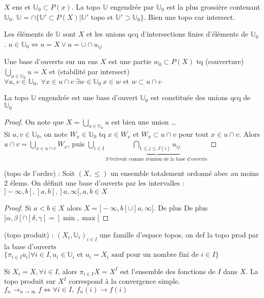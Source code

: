 \begin{definition}
     $X$ ens et $\mathbb{U}_0\subset P(x)$. La topo $\mathbb{U}$ engendrée par $\mathbb{U}_0$ est la plus grossière contenant $\mathbb{U}_0$. $\mathbb{U}=\cap \{\mathbb{U}'\subset P(X)|\mathbb{U}'\text{ topo et }\mathbb{U}'\supset \mathbb{U}_0\}$. Bien une topo car intersect.
\end{definition}
\begin{remarque}
 Les éléments de $\mathbb{U}$ sont $X$ et les unions qcq d'intersections finies d'éléments de $\mathbb{U}_0$. $u\in \mathbb{U}_0 \Leftrightarrow u=X \vee u=\cup \cap u_{ij}$
\end{remarque}
\begin{definition}
 Une base d'ouverts sur un ens $X$ est une partie $w_0\subset P(X)$ tq (couverture) $\bigcup_{u\in \mathbb{U}_0}u=X$ et (stabilité par intersect) $\forall u,v\in \mathbb{U}_0, \ \forall x\in u\cap v\ \exists w\in \mathbb{U}_0\ x\in w\text{ et } w\subset u\cap v$
\end{definition}
\begin{proposition}
    La topo $\mathbb{U}$ engendrée est une base d'ouvert $\mathbb{U}_0$ est constituée des unions qcq de $\mathbb{U}_0$
\end{proposition}
\begin{proof}
    On note que $X=\bigcup_{u\in \mathbb{U}_0}u$ est bien une union \ldots\\
    Si $u,v\in \mathbb{U}_0$, on note $W_x\in \mathbb{U}_0$ tq $x\in W_x$  et $W_x \subset u\cap v$ pour tout $x\in u\cap v$. Alors $u\cap v=\bigcup_{x\in u\cap v}W_x$, puis $\bigcup_{i\in I}\underbrace{\bigcap_{1\le j\le J(i)}u_{ij}}_{\text{S'écrivent comme réunion de la base d'ouverts}}$
\end{proof}
\begin{ex}
    (topo de l'ordre) : Soit $(X,\le )$ un ensemble totalement ordonné abec au moins 2 élems. On définit une base d'ouverts par les intervalles : $]-\infty , b[, ]a,b[, ]a,\infty [, a,b\in X$
\end{ex}
\begin{proof}
    Si $a<b\in X$ alors $X=]-\infty, b[\cup]a, \infty [$. De plus De plus $] \alpha, \beta[\cap ] \delta, \gamma[ = ]\min, \max[$
\end{proof}
\begin{ex}
     (topo produit) : $(X_i,\mathbb{U}_i)_{i\in I}$ une famille d'espace topos, on def la topo prod par la base d'ouverts $\{\pi_{i\in I}u_i|\forall i\in I, u_i\in \mathbb{U}_i \text{ et }u_i=X_i \text{ sauf pour un nombre fini de } i\in I \}$
\end{ex}
\begin{ex}
    Si $X_i=X, \forall i\in I$, alors $\pi_{i\in I}X=X^I$ est l'ensemble des fonctions de $I$ dans $X$. La topo produit sur $X^I$ correspond à la convergence simple. $f_n\to _{n\to \infty }f\Leftrightarrow \forall i\in I,\ f_n(i)\to f(i)$
\end{ex}


